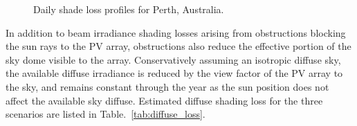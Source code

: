 \documentclass[twocolumn,10pt]{asme2ej}
\begin{document}
\begin{figure}[h!]
\begin{center}
\end{center}
\caption{Daily shade loss profiles for Perth, Australia.}
\label{fig:simple_perth}
\end{figure}


In addition to beam irradiance shading losses arising from obstructions blocking the sun rays to the PV array, obstructions also reduce the effective portion of the sky dome visible to the array.  Conservatively assuming an isotropic diffuse sky, the available diffuse irradiance is reduced by the view factor of the PV array to the sky, and remains constant through the year as the sun position does not affect the available sky diffuse.  Estimated diffuse shading loss for the three scenarios are listed in Table.~\ref{tab:diffuse_loss}.
\end{document}
